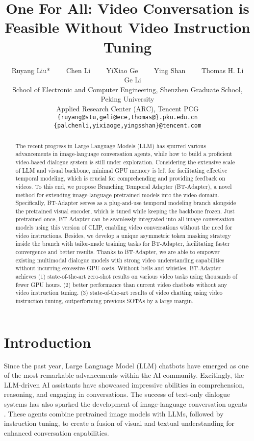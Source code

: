 \documentclass{article} \usepackage{iclr2024_conference,times}
\title{One For All: Video Conversation is Feasible Without Video Instruction Tuning}
\author{{Ruyang Liu*}~
    ~~~{Chen Li}~
    ~~~{YiXiao Ge}~
    ~~~{Ying Shan}~
    ~~~Thomas H. Li 
    ~~~{Ge Li \footnotesize{\Envelope}}\\
    {\small School of Electronic and Computer Engineering, Shenzhen Graduate School, Peking University} \\ 
    {\small Applied Research Center (ARC), Tencent PCG}\\ 
    {\tt\small \{ruyang@stu,geli@ece,thomas@\}.pku.edu.cn}\\
    {\tt\small\{palchenli,yixiaoge,yingsshan\}@tencent.com}\\  
}
\begin{document}
\maketitle

\begin{abstract}
The recent progress in Large Language Models (LLM) has spurred various advancements in image-language conversation agents, 
while how to build a proficient video-based dialogue system is still under exploration. 
Considering the extensive scale of LLM and visual backbone, minimal GPU memory is left for facilitating effective temporal modeling, which is crucial for comprehending and providing feedback on videos. 
To this end, we propose Branching Temporal Adapter (BT-Adapter), a novel method for extending image-language pretrained models into the video domain. Specifically, BT-Adapter serves as a plug-and-use temporal modeling branch alongside the pretrained visual encoder, which is tuned while keeping the backbone frozen. 
Just pretrained once, BT-Adapter can be seamlessly integrated into all image conversation models using this version of CLIP, enabling video conversations without the need for video instructions.
Besides, we develop a unique asymmetric token masking strategy inside the branch with tailor-made training tasks for BT-Adapter, facilitating faster convergence and better results.
Thanks to BT-Adapter, we are able to empower existing multimodal dialogue models with strong video understanding capabilities without incurring excessive GPU costs.
Without bells and whistles, BT-Adapter achieves (1) state-of-the-art zero-shot results on various video tasks using thousands of fewer GPU hours. (2) better performance than current video chatbots without any video instruction tuning. (3) state-of-the-art results of video chatting using video instruction tuning, outperforming previous SOTAs by a large margin.
\end{abstract}

\vspace{-0.8em}

\section{Introduction} \label{intro}
\renewcommand{\thefootnote}{ } 


Since the past year, Large Language Model (LLM) chatbots \citep{touvron2023llama, wang2022self, ouyang2022training, zeng2022glm} have emerged as one of the most remarkable advancements within the AI community. Excitingly, the LLM-driven AI assistants have showcased impressive abilities in comprehension, reasoning, and engaging in conversations. 
The success of text-only dialogue systems has also sparked the development of image-language conversation agents \citep{liu2023visual, dai2023instructblip, zhu2023minigpt, gao2023llama}. These agents combine pretrained image models with LLMs, followed by instruction tuning, to create a fusion of visual and textual understanding for enhanced conversation capabilities.
\end{document}

